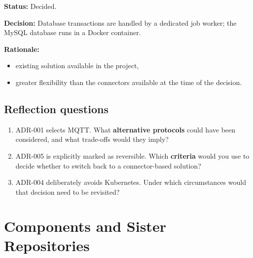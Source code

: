 \documentclass[
  english,
  11pt,
  a4paper,
]{scrbook}
\providecommand{\tightlist}{%
  \setlength{\itemsep}{0pt}\setlength{\parskip}{0pt}}
\begin{document}
\textbf{Status:} Decided.

\textbf{Decision:} Database transactions are handled by a dedicated job
worker; the MySQL database runs in a Docker container.

\textbf{Rationale:}

\begin{itemize}
\tightlist
\item
  existing solution available in the project,
\item
  greater flexibility than the connectors available at the time of the
  decision.
\end{itemize}

\section{Reflection questions}\label{reflection-questions}

\begin{tcolorbox}[enhanced jigsaw, arc=.35mm, bottomrule=.15mm, bottomtitle=1mm, breakable, colback=white, colbacktitle=quarto-callout-tip-color!10!white, colframe=quarto-callout-tip-color-frame, coltitle=black, left=2mm, leftrule=.75mm, opacityback=0, opacitybacktitle=0.6, rightrule=.15mm, title=\textcolor{quarto-callout-tip-color}{\faLightbulb}\hspace{0.5em}{For your own consideration}, titlerule=0mm, toprule=.15mm, toptitle=1mm]

\begin{enumerate}
\def\labelenumi{\arabic{enumi}.}
\tightlist
\item
  ADR-001 selects MQTT. What \textbf{alternative protocols} could have
  been considered, and what trade-offs would they imply?
\item
  ADR-005 is explicitly marked as reversible. Which \textbf{criteria}
  would you use to decide whether to switch back to a connector-based
  solution?
\item
  ADR-004 deliberately avoids Kubernetes. Under which circumstances
  would that decision need to be revisited?
\end{enumerate}

\end{tcolorbox}

\cleardoublepage
{}
{}
\appendix

\chapter{Components and Sister
Repositories}\label{components-and-sister-repositories}
\end{document}
